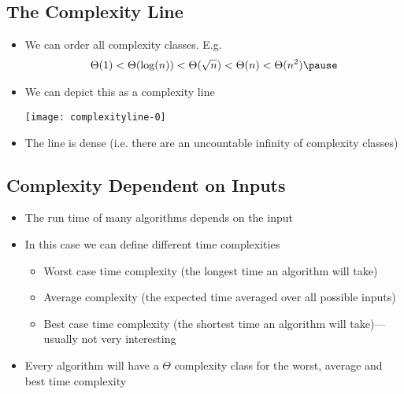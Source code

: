 
\begin{slide}
\section[-1]{The Complexity Line}

\begin{PauseHighLight}
  \begin{itemize}
  \item We can order all complexity classes. E.g.
    \begin{align*}
      \Theta(1) < \Theta(\log(n))
      <\Theta(\sqrt{n}) < \Theta(n) < \Theta(n^2)\pause
    \end{align*}
  \item We can depict this as a complexity line
    \begin{center}
      \texttt{[image: complexityline-0]}\pause
    \end{center}
  \item The line is dense (i.e. there are an uncountable infinity of
    complexity classes)\pause
  \end{itemize}
\end{PauseHighLight}

\end{slide}


\begin{slide}
\section{Complexity Dependent on Inputs}

\begin{PauseHighLight}
  \begin{itemize}
  \item The run time of many algorithms depends on the input\pause
  \item In this case we can define different time complexities
    \begin{itemize}
    \item Worst case time complexity (the longest time an algorithm will
      take)\pause
    \item Average complexity (the expected time averaged over all
      possible inputs)\pause
    \item Best case time complexity (the shortest time an algorithm will
      take)---usually not very interesting\pause
    \end{itemize}
  \item Every algorithm will have a $\Theta$ complexity class for the
    worst, average and best time complexity\pause
  \end{itemize}
\end{PauseHighLight}

\end{slide}

